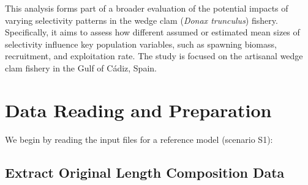\documentclass[
]{article}
\newenvironment{Shaded}{\begin{snugshade}}{\end{snugshade}}
\newcommand{\AttributeTok}[1]{\textcolor[rgb]{0.13,0.29,0.53}{#1}}
\newcommand{\ConstantTok}[1]{\textcolor[rgb]{0.56,0.35,0.01}{#1}}
\newcommand{\FunctionTok}[1]{\textcolor[rgb]{0.13,0.29,0.53}{\textbf{#1}}}
\newcommand{\NormalTok}[1]{#1}
\newcommand{\OtherTok}[1]{\textcolor[rgb]{0.56,0.35,0.01}{#1}}
\newcommand{\SpecialCharTok}[1]{\textcolor[rgb]{0.81,0.36,0.00}{\textbf{#1}}}
\newcommand{\StringTok}[1]{\textcolor[rgb]{0.31,0.60,0.02}{#1}}
\begin{document}
This analysis forms part of a broader evaluation of the potential impacts of varying selectivity patterns in the wedge clam (\emph{Donax trunculus}) fishery. Specifically, it aims to assess how different assumed or estimated mean sizes of selectivity influence key population variables, such as spawning biomass, recruitment, and exploitation rate. The study is focused on the artisanal wedge clam fishery in the Gulf of Cádiz, Spain.

\section{Data Reading and Preparation}\label{data-reading-and-preparation}

We begin by reading the input files for a reference model (scenario S1):

\begin{Shaded}
\end{Shaded}

\subsection{Extract Original Length Composition Data}\label{extract-original-length-composition-data}
\end{document}
